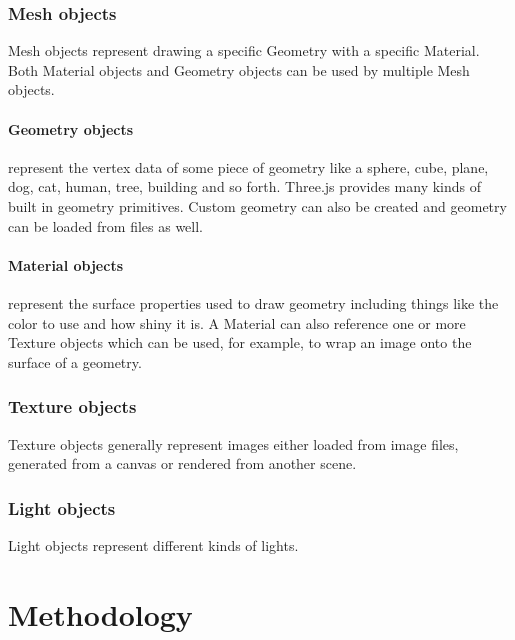 \documentclass{article}
\begin{document}
    \subsubsection{Mesh objects}
    Mesh objects represent drawing a specific Geometry with a specific Material. Both Material objects and Geometry objects can be used by multiple Mesh objects. 
    \paragraph{Geometry objects} represent the vertex data of some piece of geometry like a sphere, cube, plane, dog, cat, human, tree, building and so forth. Three.js provides many kinds of built in geometry primitives. Custom geometry can also be created and geometry can be loaded from files as well.
    
    \paragraph{Material objects} represent the surface properties used to draw geometry including things like the color to use and how shiny it is. A Material can also reference one or more Texture objects which can be used, for example, to wrap an image onto the surface of a geometry.
    
    \subsubsection{Texture objects}
    Texture objects generally represent images either loaded from image files, generated from a canvas or rendered from another scene.

    \subsubsection{Light objects}
    Light objects represent different kinds of lights.



\section{Methodology}
\end{document}
